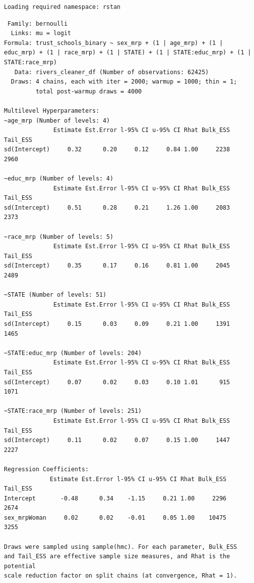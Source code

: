 \documentclass[
  letterpaper,
  DIV=11,
  numbers=noendperiod]{scrartcl}
\begin{document}
\begin{verbatim}
Loading required namespace: rstan
\end{verbatim}

\begin{verbatim}
 Family: bernoulli 
  Links: mu = logit 
Formula: trust_schools_binary ~ sex_mrp + (1 | age_mrp) + (1 | educ_mrp) + (1 | race_mrp) + (1 | STATE) + (1 | STATE:educ_mrp) + (1 | STATE:race_mrp) 
   Data: rivers_cleaner_df (Number of observations: 62425) 
  Draws: 4 chains, each with iter = 2000; warmup = 1000; thin = 1;
         total post-warmup draws = 4000

Multilevel Hyperparameters:
~age_mrp (Number of levels: 4) 
              Estimate Est.Error l-95% CI u-95% CI Rhat Bulk_ESS Tail_ESS
sd(Intercept)     0.32      0.20     0.12     0.84 1.00     2238     2960

~educ_mrp (Number of levels: 4) 
              Estimate Est.Error l-95% CI u-95% CI Rhat Bulk_ESS Tail_ESS
sd(Intercept)     0.51      0.28     0.21     1.26 1.00     2083     2373

~race_mrp (Number of levels: 5) 
              Estimate Est.Error l-95% CI u-95% CI Rhat Bulk_ESS Tail_ESS
sd(Intercept)     0.35      0.17     0.16     0.81 1.00     2045     2489

~STATE (Number of levels: 51) 
              Estimate Est.Error l-95% CI u-95% CI Rhat Bulk_ESS Tail_ESS
sd(Intercept)     0.15      0.03     0.09     0.21 1.00     1391     1465

~STATE:educ_mrp (Number of levels: 204) 
              Estimate Est.Error l-95% CI u-95% CI Rhat Bulk_ESS Tail_ESS
sd(Intercept)     0.07      0.02     0.03     0.10 1.01      915     1071

~STATE:race_mrp (Number of levels: 251) 
              Estimate Est.Error l-95% CI u-95% CI Rhat Bulk_ESS Tail_ESS
sd(Intercept)     0.11      0.02     0.07     0.15 1.00     1447     2227

Regression Coefficients:
             Estimate Est.Error l-95% CI u-95% CI Rhat Bulk_ESS Tail_ESS
Intercept       -0.48      0.34    -1.15     0.21 1.00     2296     2674
sex_mrpWoman     0.02      0.02    -0.01     0.05 1.00    10475     3255

Draws were sampled using sample(hmc). For each parameter, Bulk_ESS
and Tail_ESS are effective sample size measures, and Rhat is the potential
scale reduction factor on split chains (at convergence, Rhat = 1).
\end{verbatim}
\end{document}
